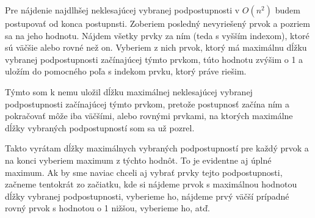 
Pre nájdenie najdlhšej neklesajúcej vybranej podpostupnosti v $O(n^2)$ 
budem postupovať od konca postupnsti. Zoberiem posledný nevyriešený 
prvok a pozriem sa na jeho hodnotu. Nájdem všetky prvky za ním (teda 
s vyšším indexom), ktoré sú väčšie alebo rovné než on. Vyberiem z nich 
prvok, ktorý má maximálnu dĺžku vybranej podpostupnosti začínajúcej 
týmto prvkom, túto hodnotu zvýšim o 1 a uložím do pomocného poľa 
s indekom prvku, ktorý práve riešim. 

Týmto som k nemu uložil dĺžku maximálnej neklesajúcej vybranej 
podpostupnosti začínajúcej týmto prvkom, pretože postupnosť začína ním 
a pokračovať môže iba väčšími, alebo rovnými prvkami, na ktorých 
maximálne dĺžky vybraných podpostupností som sa už pozrel. 

Takto vyrátam dĺžky maximálnych vybraných podpostupností pre každý prvok 
a na konci vyberiem maximum z týchto hodnôt. To je evidentne aj úplné 
maximum. Ak by sme naviac chceli aj vybrať prvky tejto podpostupnosti, 
začneme tentokrát zo začiatku, kde si nájdeme prvok s maximálnou 
hodnotou dĺžky vybranej podpostupnosti, vyberieme ho, nájdeme prvý väčší 
prípadné rovný prvok s hodnotou o 1 nižšou, vyberieme ho, atď.

